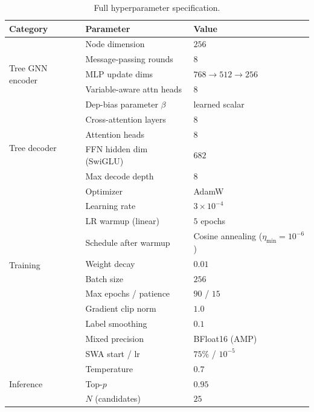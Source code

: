 \documentclass{article}
\begin{document}
\begin{table}[h]
	\centering
	\caption{Full hyperparameter specification.}
	\label{tab:hyperparams}
	\small
	\begin{tabular}{lll}
		\toprule
		Category & Parameter                  & Value                 \\
		\midrule
		\multirow{5}{*}{Tree GNN encoder}
		         & Node dimension             & $256$                 \\
		         & Message-passing rounds     & $8$                   \\
		         & MLP update dims            & $768 \to 512 \to 256$ \\
		         & Variable-aware attn heads  & $8$                   \\
		         & Dep-bias parameter $\beta$ & learned scalar        \\
		\midrule
		\multirow{4}{*}{Tree decoder}
		         & Cross-attention layers     & $8$                   \\
		         & Attention heads            & $8$                   \\
		         & FFN hidden dim (SwiGLU)    & $682$                 \\
		         & Max decode depth           & $8$                   \\
		\midrule
		\multirow{10}{*}{Training}
		         & Optimizer                  & AdamW                 \\
		         & Learning rate              & $3 \times 10^{-4}$    \\
		         & LR warmup (linear)         & $5$ epochs            \\
		         & Schedule after warmup      & Cosine annealing ($\eta_{\min}\!=\!10^{-6}$)      \\
		         & Weight decay               & $0.01$                \\
		         & Batch size                 & $256$                 \\
		         & Max epochs / patience      & $90$ / $15$           \\
		         & Gradient clip norm         & $1.0$                 \\
		         & Label smoothing            & $0.1$                 \\
		         & Mixed precision            & BFloat16 (AMP)        \\
		         & SWA start / lr             & $75\%$ / $10^{-5}$    \\
		\midrule
		\multirow{3}{*}{Inference}
		         & Temperature                & $0.7$                 \\
		         & Top-$p$                    & $0.95$                \\
		         & $N$ (candidates)           & $25$                  \\
		\bottomrule
	\end{tabular}
\end{table}
\end{document}
